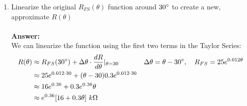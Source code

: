 \documentclass[12pt, a4paper]{article}
\begin{document}
\begin{enumerate}

\item Linearize the original $R_{FS}(\theta)$ function around $30 \degree$ to create a new, approximate $R(\theta)$ \\ \\
\textbf{Answer: } \\
We can linearize the function using the first two terms in the Taylor Series: 
\begin{align*}
R(\theta) &\approx R_{FS}(30 \degree) + \Delta \theta \cdot \frac{dR}{d\theta} |_{\theta = 30} &\Delta \theta = \theta -30 \degree, \quad R_{FS} = 25e^{0.012 \theta} \\
&\approx 25 e^{0.012 \cdot 30} + (\theta - 30) 0.3 e^{0.012 \cdot 30} \\
&\approx 16e^{0.36} + 0.3 e^{0.36} \theta \\
& \approx e^{0.36} [16 + 0.3 \theta]	\ k\Omega
\end{align*}


\end{enumerate}
\end{document}
